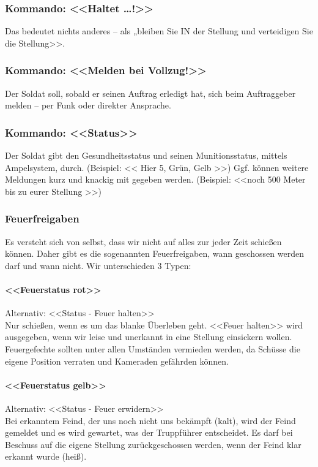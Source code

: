 \subsubsection{Kommando: <<Haltet …!>>}
	Das bedeutet nichts anderes – als „bleiben Sie IN der Stellung und verteidigen Sie die Stellung>>.

\subsubsection{Kommando: <<Melden bei Vollzug!>>}
	Der Soldat soll, sobald er seinen Auftrag erledigt hat, sich beim Auftraggeber melden – per Funk oder direkter Ansprache.

\subsubsection{Kommando: <<Status>>}
	Der Soldat gibt den Gesundheitsstatus und seinen Munitionsstatus, mittels Ampelsystem, durch. (Beispiel: << Hier 5, Grün, Gelb >>) Ggf. können weitere Meldungen kurz und knackig mit gegeben werden. (Beispiel: <<noch 500 Meter bis zu eurer Stellung >>)

\subsubsection{Feuerfreigaben}
	Es versteht sich von selbst, dass wir nicht auf alles zur jeder Zeit schießen können. Daher gibt es die sogenannten Feuerfreigaben, wann geschossen werden darf und wann nicht. Wir unterschieden 3 Typen:

\paragraph{<<Feuerstatus rot>>}
	Alternativ: <<Status - Feuer halten>>\hfil\\
	Nur schießen, wenn es um das blanke Überleben geht. <<Feuer halten>> wird ausgegeben, wenn wir leise und unerkannt in eine Stellung einsickern wollen. Feuergefechte sollten unter allen Umständen vermieden werden, da Schüsse die eigene Position verraten und Kameraden gefährden können.

\paragraph{<<Feuerstatus gelb>>}
	Alternativ: <<Status - Feuer erwidern>>\hfil\\
	Bei erkanntem Feind, der uns noch nicht uns bekämpft (kalt), wird der Feind gemeldet und es wird gewartet, was der Truppführer entscheidet. Es darf bei Beschuss auf die eigene Stellung zurückgeschossen werden, wenn der Feind klar erkannt wurde (heiß). \\


